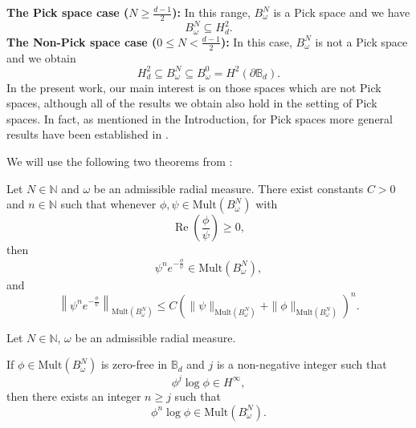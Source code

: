 \documentclass{article}
\numberwithin{equation}{section}
\begin{document}
\medskip
\noindent\textbf{The Pick space case ($N \geq \frac{d-1}{2}$):}
In this range, $B^{N}_{\omega}$ is a  Pick space and we have
\[
B^{N}_{\omega}
\subseteq 
H^2_d.
\]
\medskip
\noindent\textbf{The Non-Pick space case ($0 \le N < \frac{d-1}{2}$):}
In this case, $B^{N}_{\omega}$ is not a Pick space and we obtain
\[
H^2_d
\subseteq 
B^{N}_{\omega}
\subseteq 
B^{0}_{\omega}
=
H^2(\partial \mathbb{B}_d).
\]
 In the present work, our main interest is on those spaces which are not Pick spaces, although all of the results we obtain also hold in the setting of  Pick spaces. In fact, as mentioned in the Introduction, for  Pick spaces more general results have been established in \cite{ AlemanPerfektRichterSundbergSunkes2023, Richteriteratedlog}. 
 
 We will use the following two theorems from \cite{Richteriteratedlog}: 

\begin{thm}\label{thm:Iterated_thm4.2}
Let $N \in \mathbb{N}$ and $\omega$ be an admissible radial measure. 
 There exist constants $C > 0$ and $n \in \mathbb{N}$ such that whenever $\phi, \psi \in \mathrm{Mult}(B^N_{\omega})$ with
\[
\operatorname{Re}\!\left(\frac{\phi}{\psi}\right) \geq 0,
\]
then
\[
\psi^n e^{-\frac{\phi}{\psi}} \in \mathrm{Mult}(B^N_{\omega}),
\]
and
\[
\left\| \psi^n e^{-\frac{\phi}{\psi}} \right\|_{\mathrm{Mult}(B^N_{\omega})}
\leq
C \left( \|\psi\|_{\mathrm{Mult}(B^N_{\omega})} + \|\phi\|_{\mathrm{Mult}(B^N_{\omega})} \right)^n.
\]
\end{thm}

\begin{thm} \label{thm:Iterated_Lem4.1}
Let $N \in \mathbb{N}$, $\omega$ be an admissible radial measure.

\medskip

 If $\phi \in \mathrm{Mult}(B^N_{\omega})$ is zero-free in $\mathbb{B}_d$ and $j$ is a non-negative integer such that
\[
\phi^j \log \phi \in H^{\infty},
\]
then there exists an integer $n \geq j$ such that
\[
\phi^n \log \phi \in \mathrm{Mult}(B^N_{\omega}).
\]
\end{thm}
 
\end{document}
